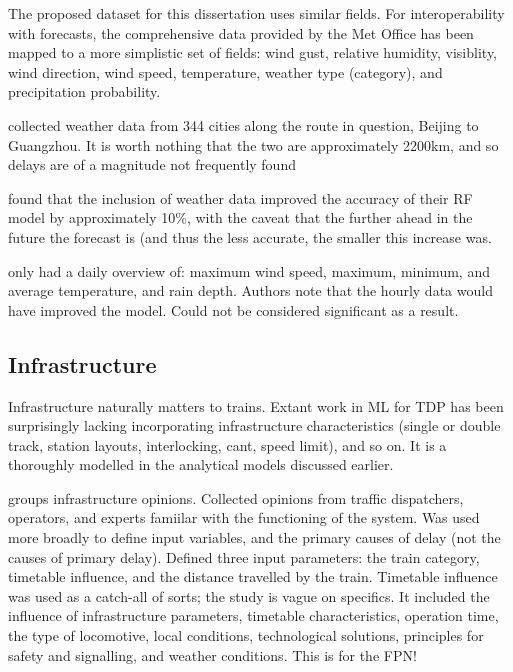 \documentclass{article}
\begin{document}
The proposed dataset for this dissertation uses similar fields. For interoperability with forecasts, the comprehensive data provided by the Met Office has been mapped to a more simplistic set of fields: wind gust, relative humidity, visiblity, wind direction, wind speed, temperature, weather type (category), and precipitation probability. 

\cite{wang_et_al_2018} collected weather data from 344 cities along the route in question, Beijing to Guangzhou. It is worth nothing that the two are approximately 2200km, and so delays are of a magnitude not frequently found

\cite{oneto_et_al_2016} found that the inclusion of weather data improved the accuracy of their RF model by approximately 10\%, with the caveat that the further ahead in the future the forecast is (and thus the less accurate, the smaller this increase was. 

\cite{nabian_et_al_2019} only had a daily overview of: maximum wind speed, maximum, minimum, and average temperature, and rain depth. Authors note that the hourly data would have improved the model. Could not be considered significant as a result. 


\subsection{Infrastructure}

Infrastructure naturally matters to trains. Extant work in ML for TDP has been surprisingly lacking incorporating infrastructure characteristics (single or double track, station layouts, interlocking, cant, speed limit), and so on. It is a thoroughly modelled in the analytical models discussed earlier.

\cite{milinkovic_et_al_2013} groups infrastructure opinions. Collected opinions from traffic dispatchers, operators, and experts famiilar with the functioning of the system. Was used more broadly to define input variables, and the primary causes of delay (not the causes of primary delay). Defined three input parameters: the train category, timetable influence, and the distance travelled by the train. Timetable influence was used as a catch-all of sorts; the study is vague on specifics. It included the influence of infrastructure parameters, timetable characteristics, operation time, the type of locomotive, local conditions, technological solutions, principles for safety and signalling, and weather conditions. This is for the FPN!
\end{document}
